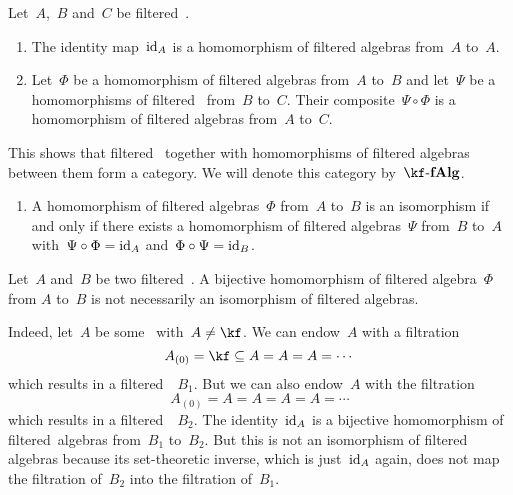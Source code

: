 \begin{remark}
  Let~$A$,~$B$ and~$C$ be filtered~\algebras{$\kf$}.
  \begin{enumerate}
    \item
      The identity map~$\mathrm{id}_A$ is a homomorphism of filtered algebras from~$A$ to~$A$.
    \item
      Let~$\Phi$ be a homomorphism of filtered algebras from~$A$ to~$B$ and let~$\Psi$ be a homomorphisms of filtered~\algebras{$\kf$} from~$B$ to~$C$.
      Their composite~$\Psi \circ \Phi$ is a homomorphism of filtered algebras from~$A$ to~$C$.
  \end{enumerate}
  This shows that filtered~\algebras{$\kf$} together with homomorphisms of filtered algebras between them form a category.
  We will denote this category by~$\cfAlg{\kf}$.
  \begin{enumerate}[resume]
    \item
      A homomorphism of filtered algebras~$\Phi$ from~$A$ to~$B$ is an isomorphism if and only if there exists a homomorphism of filtered algebras~$\Psi$ from~$B$ to~$A$ with~$\Psi \circ \Phi = \mathrm{id}_A$ and~$\Phi \circ \Psi = \mathrm{id}_B$.
  \end{enumerate}
\end{remark}


\begin{warning}
  Let~$A$ and~$B$ be two filtered~{\algebras{$\kf$}}.
  A bijective homomorphism of filtered algebra~$\Phi$ from $A$ to~$B$ is not necessarily an isomorphism of filtered algebras.
  
  Indeed, let~$A$ be some~\algebra{$\kf$} with~$A \neq \kf$.
  We can endow~$A$ with a filtration
  \[
    A_{(0)}
    =
    \kf
    \subseteq
    A
    =
    A
    =
    A
    =
    \dotsb
  \]
  which results in a filtered~{\algebra{$\kf$}}~$B_1$.
  But we can also endow~$A$ with the filtration
  \[
    A_{(0)}
    =
    A
    =
    A
    =
    A
    =
    A
    =
    \dotsb
  \]
  which results in a filtered~{\algebra{$\kf$}}~$B_2$.
  The identity~$\mathrm{id}_A$ is a bijective homomorphism of filtered~algebras from~$B_1$ to~$B_2$.
  But this is not an isomorphism of filtered algebras because its set-theoretic inverse, which is just~$\mathrm{id}_A$ again, does not map the filtration of~$B_2$ into the filtration of~$B_1$.
\end{warning}


